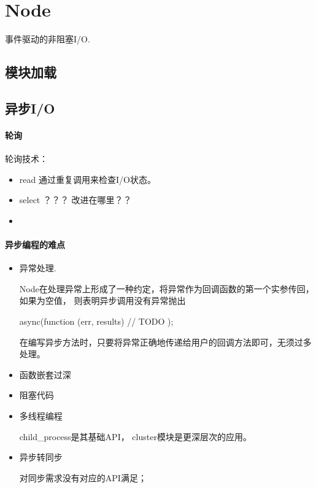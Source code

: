 \chapter{Node}

事件驱动的非阻塞I/O.

\section{模块加载}

\section{异步I/O}


\subsubsection{轮询}

轮询技术：
\begin{itemize}
\item read 通过重复调用来检查I/O状态。

\item select ？？？ 改进在哪里？？

\item 
\end{itemize}


\subsubsection{异步编程的难点}

\begin{itemize}
\item 异常处理.

Node在处理异常上形成了一种约定，将异常作为回调函数的第一个实参传回，如果为空值，
则表明异步调用没有异常抛出

\begin{JavaScript}
async(function (err, results) {
// TODO
});
\end{JavaScript}

在编写异步方法时，只要将异常正确地传递给用户的回调方法即可，无须过多处理。


\item 函数嵌套过深

\item 阻塞代码

\item 多线程编程

child\_process是其基础API， cluster模块是更深层次的应用。

\item 异步转同步

对同步需求没有对应的API满足；
\end{itemize}


